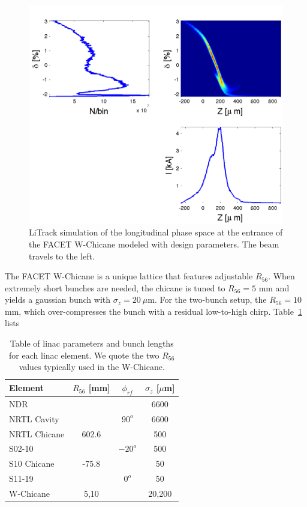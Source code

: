 \documentclass[%
twocolumn,
showpacs,preprintnumbers,
 aps,
prstab,
]{revtex4-1}
\begin{document}
\begin{figure}[hbt]
  \includegraphics[width=\columnwidth]{figures/sect19.pdf}
  \caption{LiTrack simulation of the longitudinal phase space at the entrance of the FACET W-Chicane modeled with design parameters. The beam travels to the left.}
  \label{sect19}
\end{figure}

The FACET W-Chicane is a unique lattice that features adjustable $R_{56}$.  When extremely short bunches are needed, the chicane is tuned to $R_{56} = 5$ mm and yields a gaussian bunch with $\sigma_z = 20~\mu$m. For the two-bunch setup, the $R_{56} = 10$ mm, which over-compresses the bunch with a residual low-to-high chirp. Table~\ref{dat_table} lists 

\begin{table}
  \begin{tabular}{ l c c c}
    \hline
    Element & $R_{56}$ [mm] & $\phi_{rf}$ & $\sigma_z$ [$\mu$m] \\ \hline
    NDR &  & & 6600 \\
    NRTL Cavity &  & $ 90^o$ & 6600 \\
    NRTL Chicane & 602.6 & & 500 \\
    S02-10 &  & $-20^o$ & 500 \\
    S10 Chicane & -75.8 & & 50 \\
    S11-19 & & $0^o$ & 50 \\
    W-Chicane & 5,10 & & 20,200 \\
    \hline
  \end{tabular}
   \caption{Table of linac parameters and bunch lengths for each linac element. We quote the two $R_{56}$ values typically used in the W-Chicane.}
   \label{dat_table}
\end{table}
\end{document}
